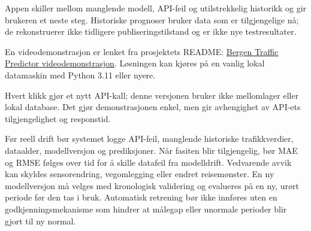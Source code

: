 Appen skiller mellom manglende modell, API-feil og utilstrekkelig historikk og gir
brukeren et neste steg. Historiske prognoser bruker data som er tilgjengelige nå;
de rekonstruerer ikke tidligere publiseringstilstand og er ikke nye testresultater.

En videodemonstrasjon er lenket fra prosjektets README:
\href{https://github.com/user-attachments/assets/5598cc2d-ddde-4813-93b8-5eb32f29f990}{Bergen
Traffic Predictor videodemonstrasjon}. Løsningen kan kjøres på en vanlig lokal
datamaskin med Python 3.11 eller nyere.

Hvert klikk gjør et nytt API-kall; denne versjonen bruker ikke mellomlager eller
lokal database. Det gjør demonstrasjonen enkel, men gir avhengighet av API-ets
tilgjengelighet og responstid.

Før reell drift bør systemet logge API-feil, manglende historiske trafikkverdier,
dataalder, modellversjon og prediksjoner. Når fasiten blir tilgjengelig, bør MAE og RMSE følges over tid for
å skille datafeil fra modelldrift. Vedvarende avvik kan skyldes sensorendring,
vegomlegging eller endret reisemønster. En ny modellversjon må velges med
kronologisk validering og evalueres på en ny, urørt periode før den tas i bruk.
Automatisk retrening bør ikke innføres uten en godkjenningsmekanisme som hindrer at
målegap eller unormale perioder blir gjort til ny normal.
